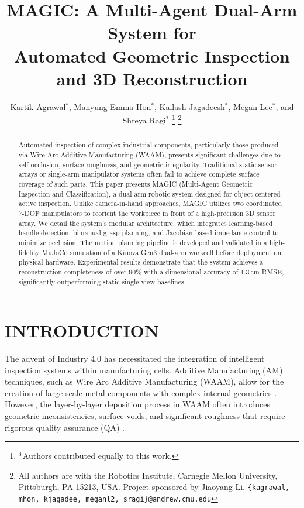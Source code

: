 \documentclass[letterpaper, 10 pt, conference]{ieeeconf}  %
\title{\LARGE \bf
MAGIC: A Multi-Agent Dual-Arm System for \\ Automated Geometric Inspection and 3D Reconstruction
}
\author{Kartik Agrawal$^{*}$, Manyung Emma Hon$^{*}$, Kailash Jagadeesh$^{*}$, Megan Lee$^{*}$, and Shreya Ragi$^{*}$%
\thanks{*Authors contributed equally to this work.}%
\thanks{All authors are with the Robotics Institute, Carnegie Mellon University,
        Pittsburgh, PA 15213, USA. Project sponsored by Jiaoyang Li.
        {\tt\small \{kagrawal, mhon, kjagadee, meganl2, sragi\}@andrew.cmu.edu}}%
}
\begin{document}
\maketitle
\thispagestyle{empty}
\pagestyle{empty}


\begin{abstract}

Automated inspection of complex industrial components, particularly those
produced via Wire Arc Additive Manufacturing (WAAM), presents significant
challenges due to self-occlusion, surface roughness, and geometric
irregularity. Traditional static sensor arrays or single-arm manipulator
systems often fail to achieve complete surface coverage of such parts. This
paper presents MAGIC (Multi-Agent Geometric Inspection and Classification), a
dual-arm robotic system designed for object-centered active inspection. Unlike
camera-in-hand approaches, MAGIC utilizes two coordinated 7-DOF manipulators
to reorient the workpiece in front of a high-precision 3D sensor array. We
detail the system's modular architecture, which integrates learning-based
handle detection, bimanual grasp planning, and Jacobian-based impedance
control to minimize occlusion. The motion planning pipeline is developed and
validated in a high-fidelity MuJoCo simulation of a Kinova Gen3 dual-arm
workcell before deployment on physical hardware. Experimental results
demonstrate that the system achieves a reconstruction completeness of over
90\% with a dimensional accuracy of 1.3\,cm RMSE, significantly
outperforming static single-view baselines.

\end{abstract}


\section{INTRODUCTION}

The advent of Industry 4.0 has necessitated the integration of intelligent
inspection systems within manufacturing cells. Additive Manufacturing (AM)
techniques, such as Wire Arc Additive Manufacturing (WAAM), allow for the
creation of large-scale metal components with complex internal geometries
\cite{waam_overview}. However, the layer-by-layer deposition process in WAAM
often introduces geometric inconsistencies, surface voids, and significant
roughness that require rigorous quality assurance (QA) \cite{son2024coordinate}.
\end{document}
